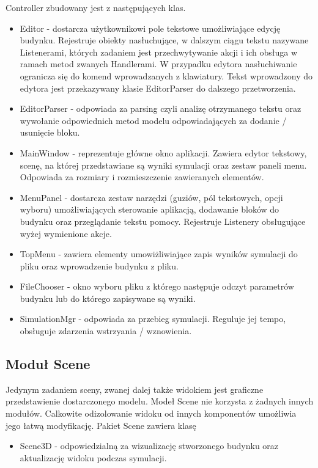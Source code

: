 Controller zbudowany jest z następujących klas.
\begin{itemize}
\item Editor - dostarcza użytkownikowi pole tekstowe umożliwiające edycję budynku. Rejestruje obiekty nasłuchujące, w dalszym ciągu tekstu nazywane Listenerami, których zadaniem jest przechwytywanie akcji i ich obsługa w ramach metod zwanych Handlerami. W przypadku edytora nasłuchiwanie ogranicza się do komend wprowadzanych z klawiatury. Tekst wprowadzony do edytora jest przekazywany klasie EditorParser do dalszego przetworzenia.
\item EditorParser - odpowiada za parsing czyli analizę otrzymanego tekstu oraz wywołanie odpowiednich metod modelu odpowiadających za 
dodanie / usunięcie bloku.
\item MainWindow - reprezentuje główne okno aplikacji. Zawiera edytor tekstowy, scenę, na której przedstawiane są wyniki symulacji oraz 
zestaw paneli menu. Odpowiada za rozmiary i rozmieszczenie zawieranych elementów.
\item MenuPanel - dostarcza zestaw narzędzi (guziów, pól tekstowych, opcji wyboru) umożliwiających sterowanie aplikacją, dodawanie bloków do budynku oraz przeglądanie tekstu pomocy. Rejestruje Listenery obsługujące wyżej wymienione akcje.
\item TopMenu - zawiera elementy umowiżliwiające zapis wyników symulacji do pliku oraz wprowadzenie budynku z pliku.
\item FileChooser - okno wyboru pliku z którego następuje odczyt parametrów budynku lub do którego zapisywane są wyniki.
\item SimulationMgr - odpowiada za przebieg symulacji. Reguluje jej tempo, obsługuje zdarzenia wstrzyania / wznowienia.
\end {itemize}

\subsection {Moduł Scene}
Jedynym zadaniem sceny, zwanej dalej także widokiem jest graficzne przedstawienie dostarczonego modelu.
Modeł Scene nie korzysta z żadnych innych modułów.
Calkowite odizolowanie widoku od innych komponentów umożliwia jego łatwą modyfikację. Pakiet Scene zawiera klasę
\begin {itemize}
\item Scene3D - odpowiedzialną za wizualizację stworzonego budynku oraz aktualizację widoku podczas symulacji.
\end {itemize}
